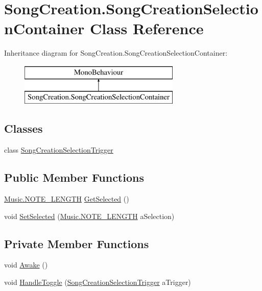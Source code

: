\hypertarget{class_song_creation_1_1_song_creation_selection_container}{}\section{Song\+Creation.\+Song\+Creation\+Selection\+Container Class Reference}
\label{class_song_creation_1_1_song_creation_selection_container}
Inheritance diagram for Song\+Creation.\+Song\+Creation\+Selection\+Container\+:\begin{figure}[H]
\begin{center}
\leavevmode
\includegraphics[height=2.000000cm]{class_song_creation_1_1_song_creation_selection_container}
\end{center}
\end{figure}
\subsection*{Classes}
\begin{DoxyCompactItemize}
\item 
class \hyperlink{group___s_c_handlers_class_song_creation_1_1_song_creation_selection_container_1_1_song_creation_selection_trigger}{Song\+Creation\+Selection\+Trigger}
\end{DoxyCompactItemize}
\subsection*{Public Member Functions}
\begin{DoxyCompactItemize}
\item 
\hyperlink{group___music_enums_gaf11b5f079adbb21c800b9eca1c5c3cbd}{Music.\+N\+O\+T\+E\+\_\+\+L\+E\+N\+G\+TH} \hyperlink{group___s_c_handlers_gac1a7dd19ee5cf14d87a09e803432acd1}{Get\+Selected} ()
\item 
void \hyperlink{group___s_c_handlers_ga71307336af2197a0ee20bbaf3bfb02aa}{Set\+Selected} (\hyperlink{group___music_enums_gaf11b5f079adbb21c800b9eca1c5c3cbd}{Music.\+N\+O\+T\+E\+\_\+\+L\+E\+N\+G\+TH} a\+Selection)
\end{DoxyCompactItemize}
\subsection*{Private Member Functions}
\begin{DoxyCompactItemize}
\item 
void \hyperlink{group___s_c_handlers_ga79e6f3c7cb63cad55eb9fa99c8698012}{Awake} ()
\item 
void \hyperlink{group___s_c_handlers_gad63b337e8edf4296db87f6753d187f97}{Handle\+Toggle} (\hyperlink{group___s_c_handlers_class_song_creation_1_1_song_creation_selection_container_1_1_song_creation_selection_trigger}{Song\+Creation\+Selection\+Trigger} a\+Trigger)
\end{DoxyCompactItemize}
